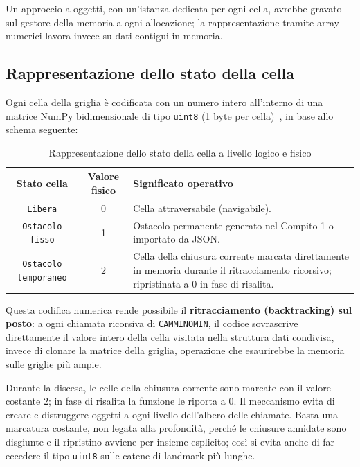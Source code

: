 Un approccio a oggetti, con un'istanza dedicata per ogni cella, avrebbe gravato sul gestore della memoria a ogni allocazione; la rappresentazione tramite array numerici lavora invece su dati contigui in memoria.

\subsection{Rappresentazione dello stato della cella}

Ogni cella della griglia è codificata con un numero intero all'interno di una matrice NumPy bidimensionale di tipo \texttt{uint8} (1 byte per cella)~\cite{numpy-dtype}, in base allo schema seguente:

\begin{table}[H]
\centering
\caption{Rappresentazione dello stato della cella a livello logico e fisico}
\begin{tabularx}{\textwidth}{|c|c|X|}
\hline
\textbf{Stato cella} & \textbf{Valore fisico} & \textbf{Significato operativo} \\ \hline
\texttt{Libera} & 0 & Cella attraversabile (navigabile). \\ \hline
\texttt{Ostacolo fisso} & 1 & Ostacolo permanente generato nel Compito 1 o importato da JSON. \\ \hline
\texttt{Ostacolo temporaneo} & $2$ & Cella della chiusura corrente marcata direttamente in memoria durante il ritracciamento ricorsivo; ripristinata a $0$ in fase di risalita. \\ \hline
\end{tabularx}
\label{tab:stato_cella}
\end{table}

Questa codifica numerica rende possibile il \textbf{ritracciamento (backtracking) sul posto}: a ogni chiamata ricorsiva di \texttt{CAMMINOMIN}, il codice sovrascrive direttamente il valore intero della cella visitata nella struttura dati condivisa, invece di clonare la matrice della griglia, operazione che esaurirebbe la memoria sulle griglie più ampie.

Durante la discesa, le celle della chiusura corrente sono marcate con il valore costante $2$; in fase di risalita la funzione le riporta a $0$. Il meccanismo evita di creare e distruggere oggetti a ogni livello dell'albero delle chiamate. Basta una marcatura costante, non legata alla profondità, perché le chiusure annidate sono disgiunte e il ripristino avviene per insieme esplicito; così si evita anche di far eccedere il tipo \texttt{uint8} sulle catene di landmark più lunghe.
